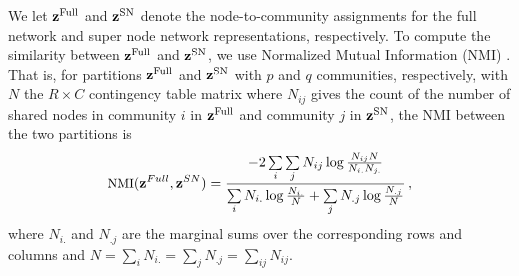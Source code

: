 We let ${\bf z}^{\text{Full}}$ and ${\bf z}^{\text{SN}}$ denote the node-to-community assignments for the full network and super node network representations, respectively. To compute the similarity between ${\bf z}^{\text{Full}}$ and ${\bf z}^{\text{SN}}$, we use Normalized Mutual Information (NMI) \cite{danon}. That is, for partitions ${\bf z}^{\text{Full}}$ and ${\bf z}^{\text{SN}}$ with $p$ and $q$ communities, respectively, with $N$ the $R \times C$ contingency table matrix where $N_{ij}$ gives the count of the number of shared nodes in community $i$ in  ${\bf z}^{\text{Full}}$ and community $j$ in ${\bf z}^{\text{SN}}$, the NMI between the two partitions is 
\begin{equation}
\label{NMI}
\small{\text{NMI}({\bf{z}}^{Full},{\bf{z}}^{SN})=\frac{-2\sum\limits_{i}\sum\limits_{j}N_{ij}\log \frac{N_{ij}N}{N_{i.}N_{j.}}}{\sum\limits_{i}N_{i.}\log\frac{N_{i.}}{N}+\sum\limits_{j}N_{.j}\log\frac{N_{.j}}{N}}}\,,
\end{equation}
where $N_{i.}$ and $N_{.j}$ are the marginal sums over the corresponding rows and columns and $N=\sum_i N_{i.}=\sum_j N_{.j}=\sum_{ij} N_{ij}$. 

